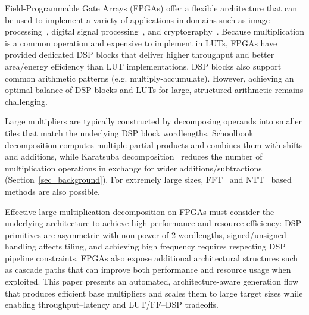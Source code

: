 \documentclass[sigconf,9pt,review]{acmart}
\begin{document}
Field-Programmable Gate Arrays (FPGAs) offer a flexible architecture that can be used to implement a variety of applications in domains such as image processing~\cite{zemcikHardwareAccelerationGraphics2002,sarrafzadehImageRestorationFPGA2003, lewisProceduralTextureMapping1999},  digital signal processing~\cite{tenhunenDSPSystemIntegration1993,baileyImplementingSignalProcessing2002,burlesonDSPReconfigurableComputingDigital2001}, and cryptography~\cite{leongKaratsubaBasedMontgomeryMultiplier2010,kocMontgomeryParameterSpaceArchitecture2016, jangECCAreaTimeEfficientHardware2020,
savasFHEDesignImplementationEncryption2020a, 
 prasannaFHEPerformanceModelingFPGA2021}.
Because multiplication is a common operation and expensive to implement in LUTs, FPGAs have provided dedicated DSP blocks that deliver higher throughput and better area/energy efficiency than LUT implementations.
DSP blocks also support common arithmetic patterns (e.g. multiply-accumulate). However, achieving an optimal balance of DSP blocks and LUTs for large, structured arithmetic remains challenging.

Large multipliers are typically constructed by decomposing operands into smaller tiles that match the underlying DSP block wordlengths.
Schoolbook decomposition computes multiple partial products and combines them with shifts and additions, while Karatsuba decomposition~\cite{karatsubaOriginalPaper} reduces the number of multiplication operations in exchange for wider additions/subtractions (Section~\ref{sec_background}).
For extremely large sizes, FFT~\cite{yapFFTquickmul2000, emerenciaFFTMultiplyingHugeIntegers, tukeyFFTAlgorithmMachineCalculation1965} and NTT~\cite{sinharoyOpenNTTAutomatedToolchain2025, weemsNTTHighPrecisionInteger2011} based methods are also possible.

Effective large multiplication decomposition on FPGAs must consider the underlying architecture to achieve high performance and resource efficiency: DSP primitives are asymmetric with non-power-of-2 wordlengths, signed/unsigned handling affects tiling, and achieving high frequency requires respecting DSP pipeline constraints.
FPGAs also expose additional architectural structures such as cascade paths that can improve both performance and resource usage when exploited.
This paper presents an automated, architecture-aware generation flow that produces efficient base multipliers and scales them to large target sizes while enabling throughput--latency and LUT/FF--DSP tradeoffs.
\end{document}
